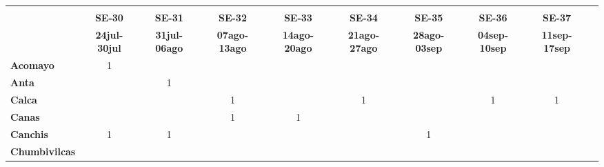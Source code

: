 \begin{tabular}{lccccccccc}
	\textbf{}              	  
	& \multicolumn{1}{l}{}                        
	& \multicolumn{1}{l}{}      
	& \multicolumn{1}{l}{}                         
	& \multicolumn{1}{l}{}                         
	& \multicolumn{1}{l}{}                         
	& \multicolumn{1}{l}{}                        
	& \multicolumn{1}{l}{}                         
	& \multicolumn{1}{l}{} \\                   
	\textbf{}                                                                 		
	&\textbf{SE-30}						
	&\textbf{SE-31} 							
	&\textbf{SE-32}						
	&\textbf{SE-33}								
	&\textbf{SE-34}					
	&\textbf{SE-35}								
	&\textbf{SE-36}
	&\textbf{SE-37}\\							
	\textbf{}              	  												
	&\textbf{24jul-30jul}						
	&\textbf{31jul-06ago}						
	&\textbf{07ago-13ago}						
	&\textbf{14ago-20ago}						
	&\textbf{21ago-27ago}						
	&\textbf{28ago-03sep}
	&\textbf{04sep-10sep}
	&\textbf{11sep-17sep} \\
	\textbf{Acomayo}                        						
	&1											
	&\cellcolor[HTML]{FCC46C}
	&\cellcolor[HTML]{FCC46C}					
	&\cellcolor[HTML]{FCC46C}
	&\cellcolor[HTML]{FCC46C}					
	&\cellcolor[HTML]{FCC46C}
	&\cellcolor[HTML]{FCC46C} 
	&\cellcolor[HTML]{FCC46C}\\
	\textbf{Anta}                                                  				
	&\cellcolor[HTML]{FCC46C}					
	&1											
	&\cellcolor[HTML]{FCC46C}					
	&\cellcolor[HTML]{FCC46C}					
	&\cellcolor[HTML]{FCC46C}					
	&\cellcolor[HTML]{FCC46C}
	&\cellcolor[HTML]{FCC46C}	
	&\cellcolor[HTML]{FCC46C}\\					
	\textbf{Calca}      				       									
	&\cellcolor[HTML]{FCC46C}	 	 	    	
	&\cellcolor[HTML]{FCC46C}					
	&1											
	&\cellcolor[HTML]{FCC46C}					
	&1											
	&\cellcolor[HTML]{FCC46C}
	&1
	&1\\          			
	\textbf{Canas}                              									
	&\cellcolor[HTML]{FCC46C}					
	&\cellcolor[HTML]{FCC46C}
	&1											
	&1
	&\cellcolor[HTML]{FCC46C}					
	&\cellcolor[HTML]{FCC46C}
	&\cellcolor[HTML]{FCC46C}	
	&\cellcolor[HTML]{FCC46C}\\	
	\textbf{Canchis}    						
	&1											
	&1			
	&\cellcolor[HTML]{FCC46C}					
	&\cellcolor[HTML]{FCC46C}			
	&\cellcolor[HTML]{FCC46C}					
	&1
	&\cellcolor[HTML]{FCC46C}
	&\cellcolor[HTML]{FCC46C}\\											
	\textbf{Chumbivilcas}                      									

\end{tabular}
